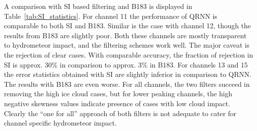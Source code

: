 \documentclass[amt, manuscript]{copernicus}
\begin{document}
A comparison with SI based filtering and B183 is displayed in  Table~\ref{tab:SI_statistics}. For channel 11 the performance of QRNN is comparable to both SI and B183. Similar is the case with channel 12, though the results from B183 are slightly poor. Both these channels are mostly transparent to hydrometeor impact, and the filtering schemes work well. The major caveat is the rejection of clear cases. With comparable accuracy, the fraction of rejection in SI is approx. 30\% in comparison to approx. 3\% in B183. For channels 13 and 15 the error statistics obtained with SI are slightly inferior in comparison to QRNN. The results with B183 are even worse. For all channels, the two filters succeed in removing the high ice cloud cases, but for lower peaking channels, the high negative skewness values indicate presence of cases with low cloud impact. Clearly the ``one for all'' approach of both filters is not adequate to cater for channel specific hydrometeor impact.  
\end{document}
